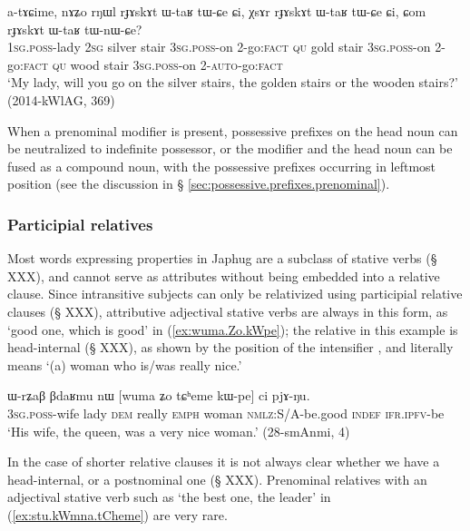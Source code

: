 \begin{exe}
\ex \label{ex:rNWl.rJAskAt}
\gll a-tɤɕime, nɤʑo rŋɯl rɟɤskɤt ɯ-taʁ tɯ-ɕe ɕi, χsɤr rɟɤskɤt ɯ-taʁ tɯ-ɕe ɕi, ɕom rɟɤskɤt ɯ-taʁ tɯ-nɯ-ɕe? \\
\textsc{1sg}.\textsc{poss}-lady \textsc{2sg} silver stair \textsc{3sg}.\textsc{poss}-on 2-go:\textsc{fact}  \textsc{qu} gold stair \textsc{3sg}.\textsc{poss}-on 2-go:\textsc{fact} \textsc{qu} wood stair \textsc{3sg}.\textsc{poss}-on 2-\textsc{auto}-go:\textsc{fact} \\
\glt `My lady, will you go on the silver stairs, the golden stairs or the wooden stairs?' (2014-kWlAG, 369)
\end{exe}

When a prenominal modifier is present, possessive prefixes on the head noun can be neutralized to indefinite possessor, or the modifier and the head noun can be fused as a compound noun, with the possessive prefixes occurring in leftmost position (see the discussion in § \ref{sec:possessive.prefixes.prenominal}).


\subsubsection{Participial relatives} \label{ex:attributive.participles.stative.verbs}
Most words expressing properties in Japhug are a subclass of stative verbs (§ XXX), and cannot serve as attributes without being embedded into a relative clause. Since intransitive subjects can only be relativized using  participial relative clauses (§ XXX), attributive adjectival stative verbs are always in this form, as  `good one, which is good' in (\ref{ex:wuma.Zo.kWpe}); the relative   in this example is head-internal (§ XXX), as shown by the position of the intensifier , and literally means `(a) woman who is/was really nice.'

\begin{exe}
   \ex  \label{ex:wuma.Zo.kWpe}
\gll  ɯ-rʑaβ βdaʁmu nɯ [wuma ʑo tɕʰeme kɯ-pe] ci pjɤ-ŋu. \\
\textsc{3sg}.\textsc{poss}-wife lady \textsc{dem} really \textsc{emph} woman \textsc{nmlz}:S/A-be.good \textsc{indef} \textsc{ifr}.\textsc{ipfv}-be \\
\glt `His wife, the queen, was a very nice woman.' (28-smAnmi, 4)
\end{exe}  

In the case of shorter relative clauses it is not always clear whether we have a head-internal, or a postnominal one (§ XXX). Prenominal relatives with an adjectival stative verb such as  `the best one, the leader' in (\ref{ex:stu.kWmna.tCheme}) are very rare.


